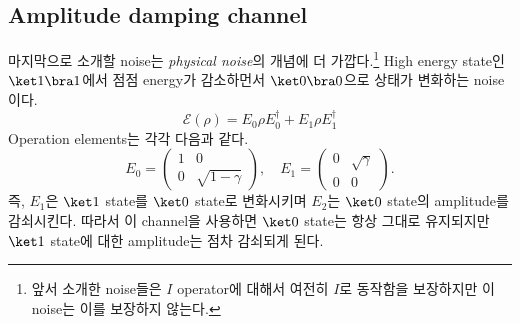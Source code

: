 \subsection{Amplitude damping channel}
마지막으로 소개할 noise는 \textit{physical noise}의 개념에 더 가깝다.\footnote{앞서 소개한 noise들은 $I$ operator에 대해서 여전히 $I$로 동작함을 보장하지만 이 noise는 이를 보장하지 않는다.} High energy state인 $\ket 1 \bra 1$에서 점점 energy가 감소하먼서 $\ket 0 \bra 0$으로 상태가 변화하는 noise이다. 
\begin{equation*}
    \mathcal{E}(\rho)=E_0 \rho E_0^{\dagger}+E_1 \rho E_1^{\dagger}
\end{equation*}
Operation elements는 각각 다음과 같다.
\begin{equation*}
    E_0=\left(\begin{array}{cc}
        1 & 0 \\
        0 & \sqrt{1-\gamma}
        \end{array}\right), \quad E_1=\left(\begin{array}{cc}
        0 & \sqrt{\gamma} \\
        0 & 0
        \end{array}\right) .
\end{equation*}
즉, $E_1$은 $\ket 1$ state를 $\ket 0$ state로 변화시키며 $E_2$는 $\ket 0$ state의 amplitude를 감쇠시킨다. 따라서 이 channel을 사용하면 $\ket 0$ state는 항상 그대로 유지되지만 $\ket 1$ state에 대한 amplitude는 점차 감쇠되게 된다.